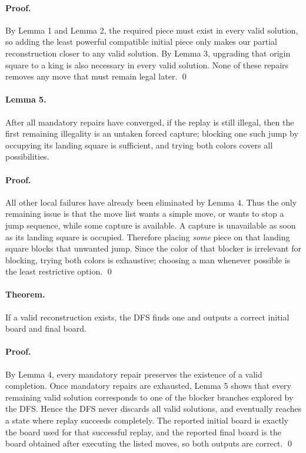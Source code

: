\documentclass[11pt]{article}
\begin{document}
\paragraph{Proof.}
By Lemma 1 and Lemma 2, the required piece must exist in every valid solution, so adding the least powerful compatible initial piece only makes our partial reconstruction closer to any valid solution. By Lemma 3, upgrading that origin square to a king is also necessary in every valid solution. None of these repairs removes any move that must remain legal later. \qed

\paragraph{Lemma 5.}
After all mandatory repairs have converged, if the replay is still illegal, then the first remaining illegality is an untaken forced capture; blocking one such jump by occupying its landing square is sufficient, and trying both colors covers all possibilities.

\paragraph{Proof.}
All other local failures have already been eliminated by Lemma 4. Thus the only remaining issue is that the move list wants a simple move, or wants to stop a jump sequence, while some capture is available. A capture is unavailable as soon as its landing square is occupied. Therefore placing \emph{some} piece on that landing square blocks that unwanted jump. Since the color of that blocker is irrelevant for blocking, trying both colors is exhaustive; choosing a man whenever possible is the least restrictive option. \qed

\paragraph{Theorem.}
If a valid reconstruction exists, the DFS finds one and outputs a correct initial board and final board.

\paragraph{Proof.}
By Lemma 4, every mandatory repair preserves the existence of a valid completion. Once mandatory repairs are exhausted, Lemma 5 shows that every remaining valid solution corresponds to one of the blocker branches explored by the DFS. Hence the DFS never discards all valid solutions, and eventually reaches a state where replay succeeds completely. The reported initial board is exactly the board used for that successful replay, and the reported final board is the board obtained after executing the listed moves, so both outputs are correct. \qed
\end{document}
